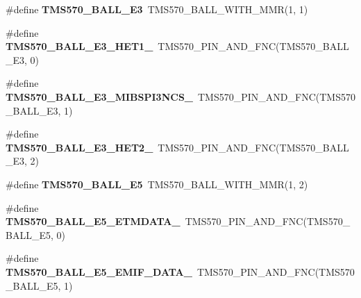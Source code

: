 \begin{DoxyCompactItemize}
\item 
\mbox{\label{tms570ls3137zwt-pins_8h_aacdf78b66d5fde059737a66c86631960}} 
\#define {\bfseries T\+M\+S570\+\_\+\+B\+A\+L\+L\+\_\+\+E3}~T\+M\+S570\+\_\+\+B\+A\+L\+L\+\_\+\+W\+I\+T\+H\+\_\+\+M\+MR(1, 1)
\item 
\mbox{\label{tms570ls3137zwt-pins_8h_adb0461589f731e79535d849af9ccc705}} 
\#define {\bfseries T\+M\+S570\+\_\+\+B\+A\+L\+L\+\_\+\+E3\+\_\+\+H\+E\+T1\+\_}~T\+M\+S570\+\_\+\+P\+I\+N\+\_\+\+A\+N\+D\+\_\+\+F\+NC(T\+M\+S570\+\_\+\+B\+A\+L\+L\+\_\+\+E3, 0)
\item 
\mbox{\label{tms570ls3137zwt-pins_8h_a0a8e702711a0a0037a5e4eb53fe198a2}} 
\#define {\bfseries T\+M\+S570\+\_\+\+B\+A\+L\+L\+\_\+\+E3\+\_\+\+M\+I\+B\+S\+P\+I3\+N\+C\+S\+\_}~T\+M\+S570\+\_\+\+P\+I\+N\+\_\+\+A\+N\+D\+\_\+\+F\+NC(T\+M\+S570\+\_\+\+B\+A\+L\+L\+\_\+\+E3, 1)
\item 
\mbox{\label{tms570ls3137zwt-pins_8h_afc21617d366f33f0c7bc0a3a1276b80a}} 
\#define {\bfseries T\+M\+S570\+\_\+\+B\+A\+L\+L\+\_\+\+E3\+\_\+\+H\+E\+T2\+\_}~T\+M\+S570\+\_\+\+P\+I\+N\+\_\+\+A\+N\+D\+\_\+\+F\+NC(T\+M\+S570\+\_\+\+B\+A\+L\+L\+\_\+\+E3, 2)
\item 
\mbox{\label{tms570ls3137zwt-pins_8h_a0cb99b6fb7157c169c7ecda51a357643}} 
\#define {\bfseries T\+M\+S570\+\_\+\+B\+A\+L\+L\+\_\+\+E5}~T\+M\+S570\+\_\+\+B\+A\+L\+L\+\_\+\+W\+I\+T\+H\+\_\+\+M\+MR(1, 2)
\item 
\mbox{\label{tms570ls3137zwt-pins_8h_ae488629db26494ef2b425adc542ea399}} 
\#define {\bfseries T\+M\+S570\+\_\+\+B\+A\+L\+L\+\_\+\+E5\+\_\+\+E\+T\+M\+D\+A\+T\+A\+\_}~T\+M\+S570\+\_\+\+P\+I\+N\+\_\+\+A\+N\+D\+\_\+\+F\+NC(T\+M\+S570\+\_\+\+B\+A\+L\+L\+\_\+\+E5, 0)
\item 
\mbox{\label{tms570ls3137zwt-pins_8h_a4ca72ead4f5949d3821b09a5efab7fb8}} 
\#define {\bfseries T\+M\+S570\+\_\+\+B\+A\+L\+L\+\_\+\+E5\+\_\+\+E\+M\+I\+F\+\_\+\+D\+A\+T\+A\+\_}~T\+M\+S570\+\_\+\+P\+I\+N\+\_\+\+A\+N\+D\+\_\+\+F\+NC(T\+M\+S570\+\_\+\+B\+A\+L\+L\+\_\+\+E5, 1)
\item 
\mbox{\label{tms570ls3137zwt-pins_8h_a29ad0877544646d7b8ef3e3148321141}} 

\end{DoxyCompactItemize}
